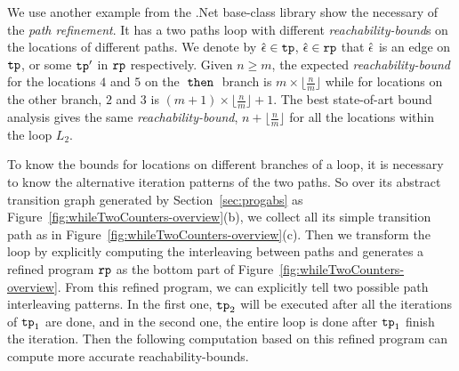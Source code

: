 \begin{example}
\label{ex:twoCounterWhile}
  We use another example from the .Net base-class library show the necessary of the \emph{path refinement}. It has a two paths loop
  with different \emph{reachability-bound}s on the locations of different paths.
  We denote by $\hat{\mathtt{\epsilon}{}} \in \mathtt{tp}$, $\hat{\mathtt{\epsilon}{}} \in\mathtt{rp}$ that $\hat{\mathtt{\epsilon}{}}$ is an edge on $\mathtt{tp}$, or some $\mathtt{tp}'$ in $\mathtt{rp}$ respectively.
Given $n \geq m$,
the expected \emph{reachability-bound} for the locations $4$ and $5$ on the $\mathtt{\;then\;}$ branch is $m \times \lfloor\frac{n}{m}\rfloor$
while for locations on the other branch, $2$ and $3$ is $(m + 1) \times \lfloor\frac{n}{m}\rfloor + 1$. 
The best state-of-art bound analysis
gives the same \emph{reachability-bound}, $n + \lfloor\frac{n}{m}\rfloor$ for all the locations within the loop $L_2$.

To know the bounds for locations on different branches of a loop, 
it is necessary to know the alternative iteration patterns of the two paths.
So over its abstract transition graph generated by Section~\ref{sec:progabs} as Figure~\ref{fig:whileTwoCounters-overview}(b), we collect all its simple transition path as in Figure~\ref{fig:whileTwoCounters-overview}(c).
Then we transform the loop by explicitly computing the interleaving between paths and
generates a refined program $\mathtt{rp}$ as the bottom part of Figure~\ref{fig:whileTwoCounters-overview}.
From this refined program, we can explicitly tell two possible path interleaving patterns.
In the first one, $\mathtt{tp}_2$ will be executed after all the iterations of $\mathtt{tp}_1$ are done, and in the second one,
the entire loop is done after $\mathtt{tp}_1$ finish the iteration.
Then the following computation based on this refined program can compute more accurate reachability-bounds.
\end{example}
